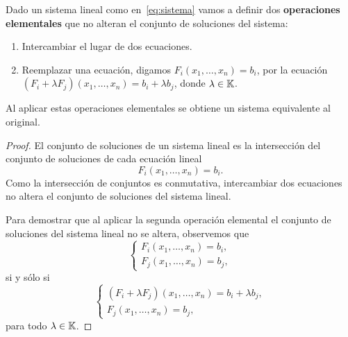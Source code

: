 \begin{block}
    Dado un sistema lineal como en~\eqref{eq:sistema} vamos a definir dos
    \textbf{operaciones elementales} que no alteran el conjunto de soluciones
    del sistema:
	\begin{enumerate}
		\item Intercambiar el lugar de dos ecuaciones.
		\item Reemplazar una ecuación, digamos $F_i(x_1,\dots,x_n)=b_i$, por la
			ecuación $(F_i+\lambda F_j)(x_1,\dots,x_n)=b_i+\lambda b_j$, donde
			$\lambda\in\mathbb{K}$. 
	\end{enumerate}

	\begin{thm*}
		Al aplicar estas operaciones elementales se obtiene un sistema
		equivalente al original.

		\begin{proof}
			El conjunto de soluciones de un sistema lineal es la intersección
			del conjunto de soluciones de cada ecuación lineal
			\[
                F_i(x_1,\dots,x_n)=b_i.
            \]
            Como la intersección de conjuntos es conmutativa, intercambiar dos
            ecuaciones no altera el conjunto de soluciones del sistema lineal.

			Para demostrar que al aplicar la segunda operación elemental el conjunto 
			de soluciones del sistema lineal no se altera, 
			observemos que 
            \[
            \begin{cases}
                F_i(x_1,\dots,x_n)=b_i,\\
                F_j(x_1,\dots,x_n)=b_j,
            \end{cases}
            \]
            si y sólo si  
            \[
            \begin{cases}
                (F_i+\lambda F_j)(x_1,\dots,x_n)=b_i+\lambda b_j,\\
                F_j(x_1,\dots,x_n)=b_j,
            \end{cases}
            \]
            para todo $\lambda\in\mathbb{K}$.
		\end{proof}
	\end{thm*}
\end{block}

